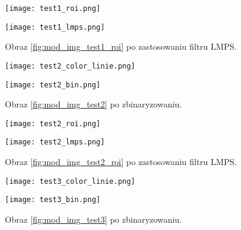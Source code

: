 \begin{figure}[h]
	\begin{minipage}{0.48\textwidth}
		\centering
		\texttt{[image: test1\_roi.png]}
		\caption{Obraz \ref{fig:mod_img_test1_bin} po wyznaczeniu ROI.}
		\label{fig:mod_img_test1_roi}
	\end{minipage}
	\begin{minipage}{0.48\textwidth}
		\centering
		\texttt{[image: test1\_lmps.png]}
		\caption{Obraz \ref{fig:mod_img_test1_roi} po zastosowaniu filtru LMPS.}
		\label{fig:mod_img_test1_lmps}
	\end{minipage}
\end{figure}



\begin{figure}
	\begin{minipage}{0.48\textwidth}
		\centering
		\texttt{[image: test2\_color\_linie.png]}
		\caption{Obraz prostej drogi z refleksami wraz z naniesionymi środkami ciężkości oraz wykrytymi liniami.}
		\label{fig:mod_img_test2}
	\end{minipage}
	\begin{minipage}{0.48\textwidth}
		\centering
		\texttt{[image: test2\_bin.png]}
		\caption{Obraz \ref{fig:mod_img_test2} po zbinaryzowaniu.}
		\label{fig:mod_img_test2_bin}
	\end{minipage}
\end{figure}

\begin{figure}
	\begin{minipage}{0.48\textwidth}
		\centering
		\texttt{[image: test2\_roi.png]}
		\caption{Obraz \ref{fig:mod_img_test2_bin} po wyznaczeniu ROI.}
		\label{fig:mod_img_test2_roi}
	\end{minipage}
	\begin{minipage}{0.48\textwidth}
		\centering
		\texttt{[image: test2\_lmps.png]}
		\caption{Obraz \ref{fig:mod_img_test2_roi} po zastosowaniu filtru LMPS.}
		\label{fig:mod_img_test2_lmps}
	\end{minipage}
\end{figure}




\begin{figure}
	\begin{minipage}{0.48\textwidth}
		\centering
		\texttt{[image: test3\_color\_linie.png]}
		\caption{Obraz prostej drogi z refleksami wraz z naniesionymi środkami ciężkości oraz wykrytymi liniami.}
		\label{fig:mod_img_test3}
	\end{minipage}
	\begin{minipage}{0.48\textwidth}
		\centering
		\texttt{[image: test3\_bin.png]}
		\caption{Obraz \ref{fig:mod_img_test3} po zbinaryzowaniu.}
		\label{fig:mod_img_test3_bin}
	\end{minipage}
\end{figure}

